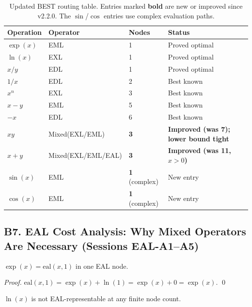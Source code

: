 \begin{table}[h]
\centering
\begin{tabular}{llll}
\hline
Operation & Operator & Nodes & Status \\
\hline
$\exp(x)$ & EML & 1 & Proved optimal \\
$\ln(x)$  & EXL & 1 & Proved optimal \\
$x/y$     & EDL & 1 & Proved optimal \\
$1/x$     & EDL & 2 & Best known \\
$x^n$     & EXL & 3 & Best known \\
$x - y$   & EML & 5 & Best known \\
$-x$      & EDL & 6 & Best known \\
$xy$      & Mixed(EXL/EML) & \textbf{3} & \textbf{Improved (was 7); lower bound tight} \\
$x+y$     & Mixed(EXL/EML/EAL) & \textbf{3} & \textbf{Improved (was 11, $x>0$)} \\
$\sin(x)$ & EML & \textbf{1} (complex) & New entry \\
$\cos(x)$ & EML & \textbf{1} (complex) & New entry \\
\hline
\end{tabular}
\caption{Updated BEST routing table. Entries marked \textbf{bold} are new or improved
since v2.2.0. The $\sin$/$\cos$ entries use complex evaluation paths.}
\end{table}

\subsection*{B7. EAL Cost Analysis: Why Mixed Operators Are Necessary (Sessions EAL-A1--A5)}

\begin{proposition}
$\exp(x) = \mathrm{eal}(x, 1)$ in one EAL node.
\end{proposition}

\begin{proof}
$\mathrm{eal}(x, 1) = \exp(x) + \ln(1) = \exp(x) + 0 = \exp(x)$. \qed
\end{proof}

\begin{theorem}
\label{thm:eal-ln-impossible}
$\ln(x)$ is not EAL-representable at any finite node count.
\end{theorem}

